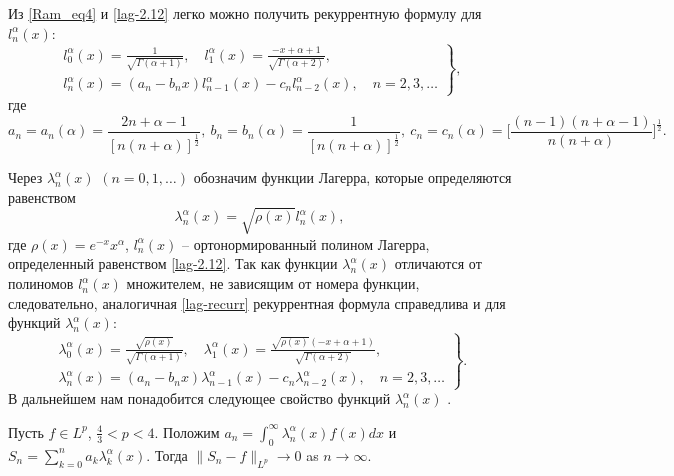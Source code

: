 Из \eqref{Ram_eq4} и \eqref{lag-2.12} легко можно получить рекуррентную формулу для $l_n^\alpha(x)$:
\begin{equation}\label{lag-recurr}
\left.\begin{gathered}
l_{0}^{\alpha}(x)=\frac{1}{\sqrt{\Gamma(\alpha+1)}}, \quad l_1^{\alpha}(x)=\frac{-x+\alpha+1}{\sqrt{\Gamma(\alpha+2)}},\\
l_n^{\alpha}(x)=(a_n-b_n x)l_{n-1}^{\alpha}(x)-c_n l_{n-2}^{\alpha}(x), \quad n=2, 3, \ldots
\end{gathered}\right\},
\end{equation}
где
\begin{equation*}
a_n=a_n(\alpha)=\frac{2n+\alpha-1}{[n(n+\alpha)]^\frac{1}{2}},\
b_n=b_n(\alpha)=\frac{1}{[n(n+\alpha)]^\frac{1}{2}},\
c_n=c_n(\alpha)=\Big[\frac{(n-1)(n+\alpha-1)}{n(n+\alpha)}\Big]^\frac{1}{2}.
\end{equation*}

Через $\lambda_n^\alpha(x)$ $(n=0, 1, \ldots)$ обозначим функции Лагерра, которые определяются равенством
\begin{equation}\label{funcLag}
\lambda_n^\alpha(x)=\sqrt{\rho(x)}l_n^\alpha(x),
\end{equation}
где $\rho(x)=e^{-x}x^\alpha$, $l_n^\alpha(x)$ -- ортонормированный полином Лагерра, определенный равенством \eqref{lag-2.12}.
Так как функции $\lambda_n^\alpha(x)$ отличаются от полиномов $l_n^\alpha(x)$ множителем, не зависящим от номера функции, следовательно, аналогичная \eqref{lag-recurr} рекуррентная формула справедлива и для функций $\lambda_n^\alpha(x)$:
\begin{equation*}
\left.\begin{gathered}
\lambda_{0}^{\alpha}(x)=\frac{\sqrt{\rho(x)}}{\sqrt{\Gamma(\alpha+1)}}, \quad \lambda_1^{\alpha}(x)=\frac{\sqrt{\rho(x)}(-x+\alpha+1)}{\sqrt{\Gamma(\alpha+2)}},\\
\lambda_n^{\alpha}(x)=(a_n-b_n x)\lambda_{n-1}^{\alpha}(x)-c_n \lambda_{n-2}^{\alpha}(x), \quad n=2, 3, \ldots
\end{gathered}\right\}.
\end{equation*}
В дальнейшем нам понадобится следующее свойство функций $\lambda_{n}^{\alpha}(x)$ \cite[Theorem 1]{AskeyWaiger}.

\begin{theoremA}\label{Ram_thA}
	Пусть $f\in L^p$, $\frac{4}{3}<p<4$. Положим $a_n=\int_{0}^{\infty}\lambda^\alpha_n(x)f(x)dx$ и $S_n=\sum_{k=0}^{n}a_k\lambda^\alpha_k(x)$. Тогда $\|S_n-f\|_{L^p}\rightarrow0$ as $n\rightarrow\infty$.
\end{theoremA}


